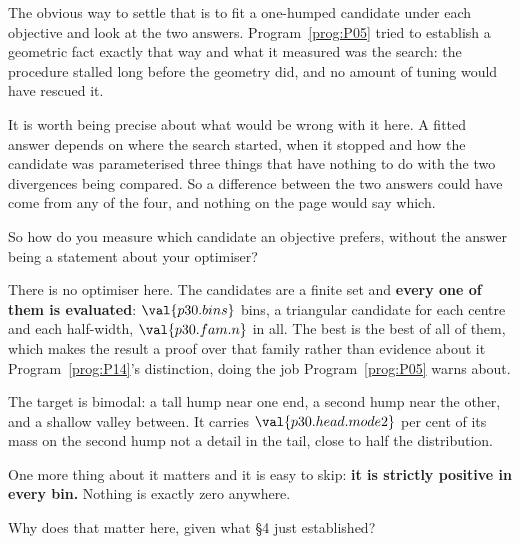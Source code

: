 \begin{fr}
The obvious way to settle that is to fit a one-humped candidate under each
objective and look at the two answers. Program~\ref{prog:P05} tried to
establish a geometric fact exactly that way and what it measured was the
search: the procedure stalled long before the geometry did, and no amount of
tuning would have rescued it.

It is worth being precise about what would be wrong with it here. A fitted
answer depends on where the search started, when it stopped and how the
candidate was parameterised \dash{} three things that have nothing to do with
the two divergences being compared. So a difference between the two answers
could have come from any of the four, and nothing on the page would say
which.

So how do you measure which candidate an objective prefers, without the
answer being a statement about your optimiser?
\dotline
\nextframe
\end{fr}

\begin{fr}

There is no optimiser here. The candidates are a finite set and
\textbf{every one of them is evaluated}: $\val{p30.bins}$ bins, a triangular
candidate for each centre and each half-width, $\val{p30.fam.n}$ in all. The
best is the best of all of them, which makes the result a proof over that
family rather than evidence about it \dash{} Program~\ref{prog:P14}'s
distinction, doing the job Program~\ref{prog:P05} warns about.
\end{fr}

\begin{fr}
The target is bimodal: a tall hump near one end, a second hump near the
other, and a shallow valley between. It carries $\val{p30.head.mode2}$ per
cent of its mass on the second hump \dash{} not a detail in the tail, close
to half the distribution.

One more thing about it matters and it is easy to skip: \textbf{it is
strictly positive in every bin.} Nothing is exactly zero anywhere.

Why does that matter here, given what §4 just established?
\dotline
\nextframe
\end{fr}


